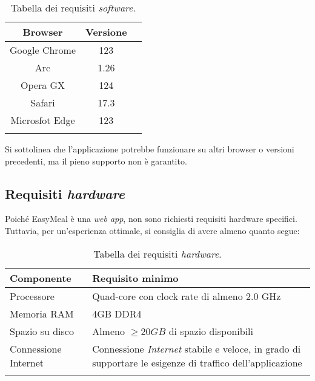 \begin{longtable}{|c|c|c|}
	\hline
	\textbf{Browser}       & \textbf{ Versione}    \\
	\hline
    Google Chrome             & 123                    \\
    \hline
    Arc                       & 1.26                    \\
    \hline
    Opera GX                       & 124                    \\
    \hline
    Safari                        & 17.3                    \\
    \hline
    Microsfot Edge                 & 123                      \\
    \hline

    \caption{Tabella dei requisiti \textit{software}.}
\end{longtable}

Si sottolinea che l'applicazione potrebbe funzionare su altri browser o versioni precedenti, ma il pieno supporto non è garantito.


\subsection{Requisiti \textit{hardware}}
Poiché EasyMeal è una \textit{web app}, non sono richiesti requisiti hardware specifici. 
Tuttavia, per un'esperienza ottimale, si consiglia di avere almeno quanto segue:

\begin{longtable}{|l|p{}|}
	\hline
	\textbf{Componente}       & \textbf{ Requisito minimo}   \\
	\hline
     Processore             &  Quad-core con clock rate di almeno 2.0 GHz      \\
    \hline
     Memoria RAM            &  4GB DDR4       \\
    \hline
    Spazio su disco         &  Almeno $ \geq  20 GB$ di spazio disponibili        \\
    \hline
    Connessione Internet         & Connessione \textit{Internet} stabile e veloce, in grado di supportare le esigenze di traffico dell'applicazione         \\
    \hline

    \caption{Tabella dei requisiti \textit{hardware}.}
\end{longtable}